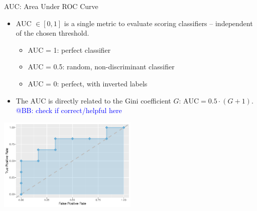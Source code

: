 \begin{vbframe}{AUC: Area Under ROC Curve}

\begin{itemize}
  \item AUC $\in [0,1]$ is a single metric to evaluate scoring classifiers --
  independent of the chosen threshold.
  \begin{itemize}
    \item AUC = 1: perfect classifier
    \item AUC = 0.5: random, non-discriminant classifier
    \item AUC = 0: perfect, with inverted labels
  \end{itemize}
  \item The AUC is directly related to the Gini coefficient $G$: 
  $\text{AUC} = 0.5 \cdot (G + 1)$. 
  \textcolor{blue}{@BB: check if correct/helpful here}
\end{itemize}

\begin{center}
  \includegraphics[width=0.5\textwidth]{figure/eval_mclass_roc_sp_12_1}
\end{center}

\end{vbframe}


% 
% 
% 


% 
% 
% 



\endlecture

